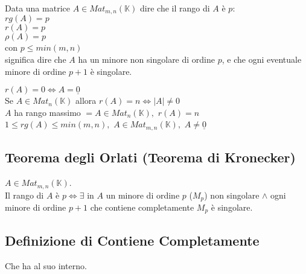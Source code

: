 \documentclass[a4paper, twoside, italian, 11pt]{book}
\newcommand{\K}{\mathbb{K}}
\begin{document}
Data una matrice $A \in Mat_{m,n}(\K)$ dire che il rango di $A$ è $p$: \\

\noindent
$rg(A) = p$ \\
$r(A) = p$ \\
$\rho(A) = p$ \\

\noindent
con $p \leq min(m, n)$ \\

\noindent
significa dire che $A$ ha un minore non singolare di ordine $p$, e che ogni eventuale minore di ordine $p + 1$ è singolare.

\noindent
$r(A) = 0 \iff A = \underline{0}$ \\

\noindent
Se $A \in Mat_n(\K)$ allora $r(A) = n \iff \left | A \right | \neq 0$ \\

\noindent
$A$ ha rango massimo $= A \in Mat_n(\K),$ $r(A) = n$ \\

\noindent
$1 \leq rg(A) \leq min(m,n),$ $A \in Mat_{m,n}(\K),$ $A \neq \underline{0}$


\subsection{Teorema degli Orlati (Teorema di Kronecker)}

$A \in Mat_{m,n}(\K)$.\\
Il rango di $A$ è $p \iff \exists$ in $A$ un minore di ordine $p$ ($M_p$) non singolare $\land$ ogni minore di ordine $p + 1$ che contiene completamente $M_p$ è singolare.


\subsection{Definizione di Contiene Completamente}
Che ha al suo interno.
\end{document}
